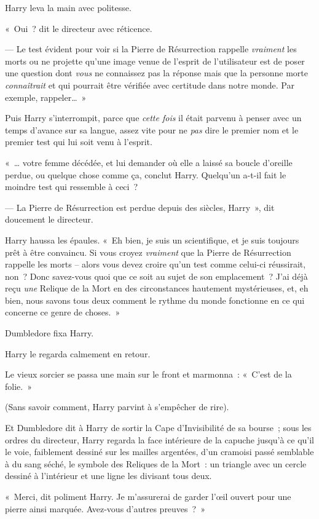 Harry leva la main avec politesse.

«~Oui~? dit le directeur avec réticence.

--- Le test évident pour voir si la Pierre de Résurrection rappelle \emph{vraiment} les morts ou ne projette qu'une image venue de l'esprit de l'utilisateur est de poser une question dont \emph{vous} ne connaissez pas la réponse mais que la personne morte \emph{connaîtrait} et qui pourrait être vérifiée avec certitude dans notre monde. Par exemple, rappeler…~»

Puis Harry s'interrompit, parce que \emph{cette fois} il était parvenu à penser avec un temps d'avance sur sa langue, assez vite pour ne \emph{pas} dire le premier nom et le premier test qui lui soit venu à l'esprit.

«~… votre femme décédée, et lui demander où elle a laissé sa boucle d'oreille perdue, ou quelque chose comme ça, conclut Harry. Quelqu'un a-t-il fait le moindre test qui ressemble à ceci~?

--- La Pierre de Résurrection est perdue depuis des siècles, Harry~», dit doucement le directeur.

Harry haussa les épaules. «~Eh bien, je suis un scientifique, et je suis toujours prêt à être convaincu. Si vous croyez \emph{vraiment} que la Pierre de Résurrection rappelle les morts -- alors vous devez croire qu'un test comme celui-ci réussirait, non~? Donc savez-vous quoi que ce soit au sujet de son emplacement~? J'ai déjà reçu \emph{une} Relique de la Mort en des circonstances hautement mystérieuses, et, eh bien, nous savons tous deux comment le rythme du monde fonctionne en ce qui concerne ce genre de choses.~»

Dumbledore fixa Harry.

Harry le regarda calmement en retour.

Le vieux sorcier se passa une main sur le front et marmonna~: «~C'est de la folie.~»

(Sans savoir comment, Harry parvint à s'empêcher de rire).

Et Dumbledore dit à Harry de sortir la Cape d'Invisibilité de sa bourse~; sous les ordres du directeur, Harry regarda la face intérieure de la capuche jusqu'à ce qu'il le voie, faiblement dessiné sur les mailles argentées, d'un cramoisi passé semblable à du sang séché, le symbole des Reliques de la Mort~: un triangle avec un cercle dessiné à l'intérieur et une ligne les divisant tous deux.

«~Merci, dit poliment Harry. Je m'assurerai de garder l'œil ouvert pour une pierre ainsi marquée. Avez-vous d'autres preuves~?~»


